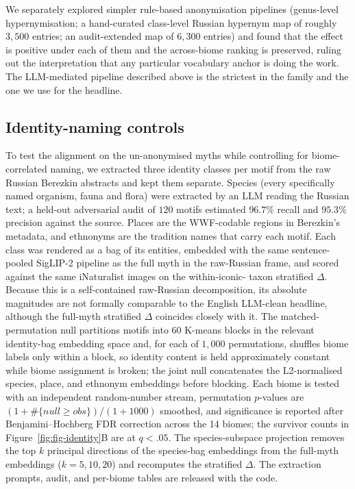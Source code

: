 \documentclass[11pt,a4paper]{article}
\begin{document}
We separately explored simpler rule-based anonymisation pipelines
(genus-level hypernymisation; a hand-curated class-level Russian
hypernym map of roughly $3{,}500$ entries; an audit-extended map
of $6{,}300$ entries) and found that the effect is positive under
each of them and the across-biome ranking is preserved, ruling out
the interpretation that any particular vocabulary anchor is doing
the work. The LLM-mediated pipeline described above is the
strictest in the family and the one we use for the headline.

\subsection*{Identity-naming controls}

To test the alignment on the un-anonymised myths while controlling
for biome-correlated naming, we extracted three identity classes
per motif from the raw Russian Berezkin abstracts and kept them
separate. Species (every specifically named organism, fauna and
flora) were extracted by an LLM reading the Russian text; a
held-out adversarial audit of $120$ motifs estimated $96.7\%$
recall and $95.3\%$ precision against the source. Places are the
WWF-codable regions in Berezkin's metadata, and ethnonyms are the
tradition names that carry each motif. Each class was rendered as a
bag of its entities, embedded with the same sentence-pooled
SigLIP-2 pipeline as the full myth in the raw-Russian frame, and
scored against the same iNaturalist images on the within-iconic-
taxon stratified $\Delta$. Because this is a self-contained
raw-Russian decomposition, its absolute magnitudes are not
formally comparable to the English LLM-clean headline, although the
full-myth stratified $\Delta$ coincides closely with it. The
matched-permutation null partitions motifs into $60$ K-means blocks
in the relevant identity-bag embedding space and, for each of
$1{,}000$ permutations, shuffles biome labels only within a block,
so identity content is held approximately constant while biome
assignment is broken; the joint null concatenates the
L2-normalised species, place, and ethnonym embeddings before
blocking. Each biome is tested with an independent random-number
stream, permutation $p$-values are $(1+\#\{null \geq obs\})/(1+1000)$
smoothed, and significance is reported after Benjamini--Hochberg FDR
correction across the 14 biomes; the survivor counts in
Figure~\ref{fig:fig-identity}B are at $q<.05$. The species-subspace
projection removes the top $k$ principal directions of the
species-bag embeddings from the full-myth embeddings
($k = 5, 10, 20$) and recomputes the stratified $\Delta$. The
extraction prompts, audit, and per-biome tables are released with
the code.
\end{document}
